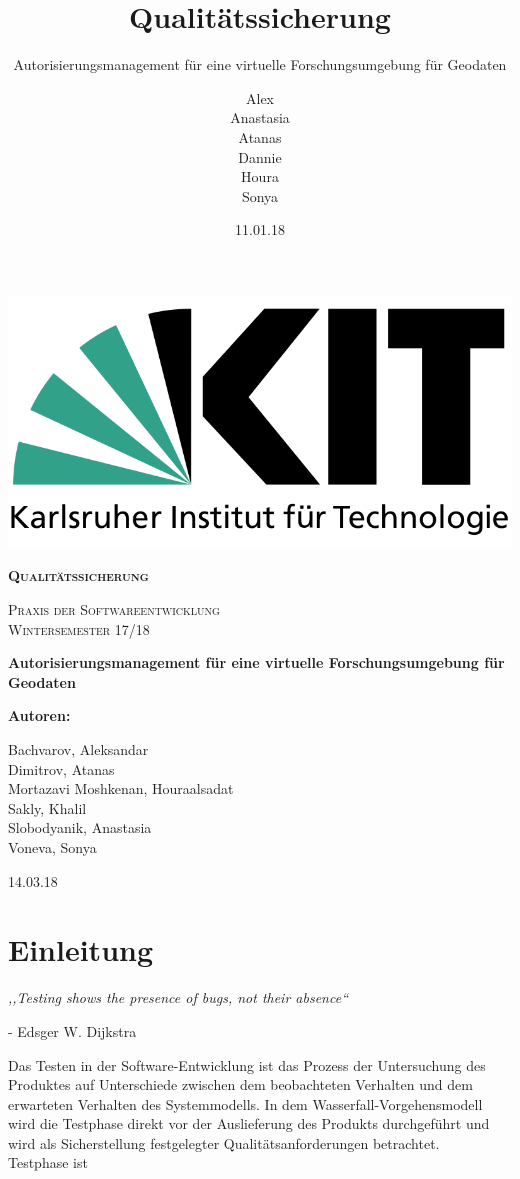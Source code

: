 \documentclass[parskip=full,11pt]{scrartcl}
\title{Qualitätssicherung}
\subtitle{Autorisierungsmanagement für eine virtuelle Forschungsumgebung für Geodaten}
\author{Alex\\Anastasia\\Atanas\\Dannie\\ Houra\\Sonya\\}
\date{11.01.18}
\begin{document}
 
 \begin{titlepage}
 	
 	\begin{center}
 	\includegraphics[width=0.5\linewidth]{res/KITLogo.png}\\
 	\vspace{2cm}
 	{\scshape\LARGE\bfseries Qualitätssicherung \par}
 	\vspace{0.5cm}
 	{\scshape\Large Praxis der Softwareentwicklung\\}
 	\vspace{1cm}
 	{\scshape\Large Wintersemester 17/18\\}
 	\vspace{2cm}
 	{\huge\bfseries Autorisierungsmanagement für eine virtuelle Forschungsumgebung für Geodaten\par}
 	\vspace{2cm}
 	\vfill
 	{\bfseries {\Large Autoren}:\par}
 	{\Large Bachvarov, Aleksandar }\\
 	{\Large Dimitrov, Atanas }\\
 	{\Large Mortazavi Moshkenan, Houraalsadat }\\
 	{\Large Sakly, Khalil }\\
 	{\Large Slobodyanik, Anastasia }\\
 	{\Large Voneva, Sonya}\\
 	\vfill
 	{\large 14.03.18 \par}
 	\end{center}
 \end{titlepage}
 
 \tableofcontents
 \newpage
 \section{Einleitung}
\begin{center}
\textit{,,Testing shows the presence of bugs, not their absence``}
\end{center}
\begin{flushright}
- Edsger W. Dijkstra\\
\end{flushright}
Das Testen in der Software-Entwicklung ist das Prozess der Untersuchung des Produktes auf Unterschiede zwischen dem beobachteten Verhalten und dem erwarteten Verhalten des Systemmodells.
In dem Wasserfall-Vorgehensmodell wird die Testphase direkt vor der Auslieferung des Produkts durchgeführt und wird als Sicherstellung festgelegter Qualitätsanforderungen betrachtet.\\
Testphase ist 
 \newpage
\end{document}
